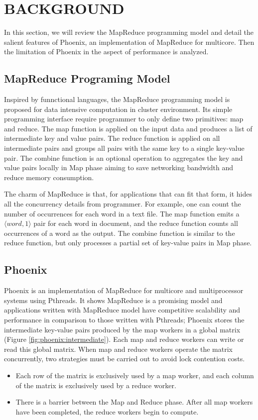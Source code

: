 \section{BACKGROUND}
In this section, we will review the MapReduce programming
model and detail the salient features of Phoenix, 
an implementation of MapReduce for multicore.
Then the limitation of Phoenix in the aspect of performance is analyzed.

\subsection{MapReduce Programing Model}
Inspired  by funnctional languages, the MapReduce programming model is 
proposed for data intensive computation in cluster environment.
Its simple programming interface require programmer 
to only define two primitives: map and reduce.
The map function is applied on the input data and 
produces a list of intermediate key and value pairs.
The reduce function is applied on all intermediate
pairs and  groups all pairs with the same key to a single
key-value pair. 
The combine function is an optional operation 
to aggregates the key and value pairs locally in Map phase 
aiming to save networking bandwidth and reduce memory consumption.


The charm of MapReduce is that, 
for applications that can fit that form, 
it hides all the concurrency details from  programmer. 
For example, 
one can count the number of occurrences for each word in a text file. 
The map function emits a $\langle word, 1\rangle$ pair for each word in document, 
and the reduce function counts all occurrences of a word as the output. 
The combine function is similar to the reduce function, 
but only processes a partial set of key-value pairs in Map phase.


\subsection{Phoenix}
Phoenix is an implementation of MapReduce for multicore  and multiprocessor systems using Pthreads\cite{}.
It shows MapReduce is a promising model  and applications written with MapReduce model
have competitive scalability and performance in comparison to those
written with Pthreads\cite{ranger2007phoenix};
Phoenix stores the intermediate key-value pairs produced 
by the map workers in a global matrix (Figure \ref{fig:phoenix:intermediate}). 
Each map and reduce workers can write or read this global matrix. 
When map and reduce workers operate the matrix concurrently,
two strategies must be carried out to avoid lock contention costs.
\begin{itemize}
	\item Each row of the matrix is exclusively used by a map worker, 
	and each column of the matrix is exclusively used by a reduce worker. 
	\item There is a barrier between the Map and Reduce phase. 
	After all map workers have been completed, 
	the reduce workers begin to compute. 
\end{itemize}

